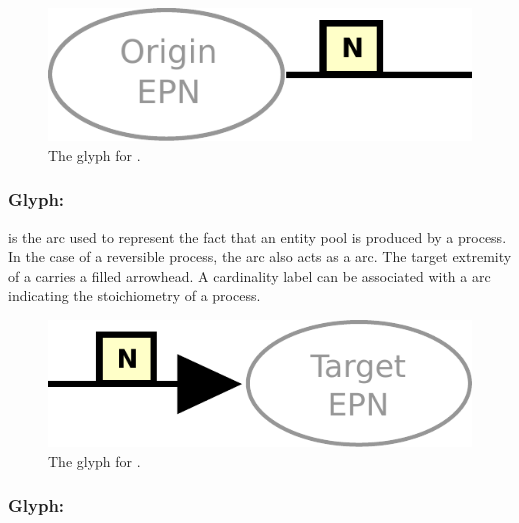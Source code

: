 \begin{figure}[htb]
  \centering
  \includegraphics[scale = 0.4]{le_images/consumption}
  \caption{The \PD glyph for .}
  \label{fig:consumption}
\end{figure}



\subsubsection{Glyph: }\label{sec:production}

 is the arc used to represent the fact that an entity pool is produced by a process. In the case of a reversible process, the 
 arc also acts as a  arc. The target extremity of a  carries a filled arrowhead. A cardinality label can be associated with a  arc indicating the stoichiometry of a process.

\begin{figure}[htb]
  \centering
  \includegraphics[scale = 0.4]{le_images/production}
  \caption{The \PD glyph for .}
  \label{fig:production}
\end{figure}

\subsubsection{Glyph: }\label{sec:modulation}

